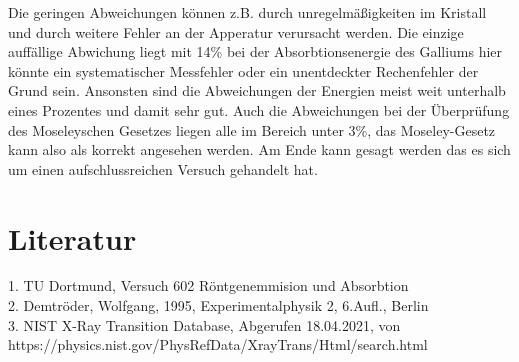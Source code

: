 Die geringen Abweichungen können z.B. durch unregelmäßigkeiten im Kristall und durch weitere Fehler an der Apperatur verursacht werden.
Die einzige auffällige Abwichung liegt mit 14\% bei der Absorbtionsenergie des Galliums hier könnte ein systematischer Messfehler oder
ein unentdeckter Rechenfehler der Grund sein. Ansonsten sind die Abweichungen der Energien meist weit unterhalb eines Prozentes und damit
sehr gut. Auch die Abweichungen bei der Überprüfung des Moseleyschen Gesetzes liegen alle im Bereich unter 3\%, das Moseley-Gesetz kann 
also als korrekt angesehen werden.
Am Ende kann gesagt werden das es sich um einen aufschlussreichen Versuch gehandelt hat.
\section{Literatur}
\label{Literatur}
1. TU Dortmund, Versuch 602 Röntgenemmision und Absorbtion\\
2. Demtröder, Wolfgang, 1995, Experimentalphysik 2, 6.Aufl., Berlin\\
3. NIST X-Ray Transition Database, Abgerufen 18.04.2021, von https://physics.nist.gov/PhysRefData/XrayTrans/Html/search.html


